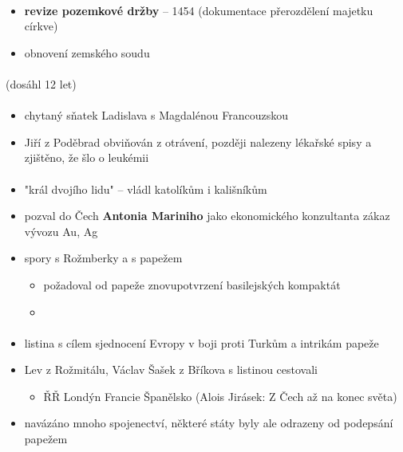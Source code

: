 \paragraph{}
\begin{itemize}
\item \textbf{revize pozemkové držby} -- 1454 (dokumentace přerozdělení majetku církve)
\item obnovení zemského soudu
\end{itemize}

\paragraph{} (dosáhl 12 let)

\paragraph{}
\begin{itemize}
\item chytaný sňatek Ladislava s Magdalénou Francouzskou
\item Jiří z Poděbrad obviňován z otrávení, později nalezeny lékařské spisy a zjištěno, že šlo o leukémii
\end{itemize}

\paragraph{}
\begin{itemize}
\item "král dvojího lidu" -- vládl katolíkům i kališníkům
\item pozval do Čech \textbf{Antonia Mariniho} jako ekonomického konzultanta \ra zákaz vývozu Au, Ag
\item spory s Rožmberky a s papežem
	\begin{itemize}
	\item požadoval od papeže znovupotvrzení basilejských kompaktát
	\item {}
	\end{itemize}
\end{itemize}

\paragraph{}
\begin{itemize}
\item listina s cílem sjednocení Evropy v boji proti Turkům a intrikám papeže
\item Lev z Rožmitálu, Václav Šašek z Bříkova s listinou cestovali 
	\begin{itemize}
	\item ŘŘ \ra Londýn \ra Francie \ra Španělsko (\ra Alois Jirásek: Z Čech až na konec světa)
	\end{itemize}
\item navázáno mnoho spojenectví, některé státy byly ale odrazeny od podepsání papežem
\end{itemize}

